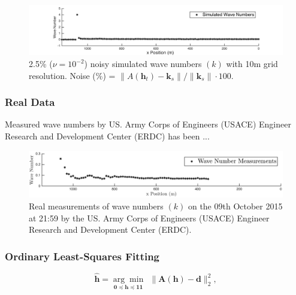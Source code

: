 \begin{figure}[H]
\center
\includegraphics[scale=0.6]{img/simulated_data_k10m.png} 
\caption{2.5\% ($\nu = 10^{-2}$) noisy simulated wave numbers $(k)$ with 10m grid resolution. Noise (\%) = $\|A(\mathbf{h}_t) -  \mathbf{k}_s\| / \|  \mathbf{k}_s \| \cdot 100$. }
\label{Simulated10m}
\end{figure}


\subsubsection{Real Data}


Measured wave numbers by US. Army Corps of Engineers (USACE) Engineer Research and Development Center (ERDC) has been ...

\begin{figure}[H]
\center
\includegraphics[scale=0.5]{img/real_data_k_Oct09.png} 
\caption{Real measurements of wave numbers $(k)$ on the 09th October 2015 at 21:59 by the US. Army Corps of Engineers (USACE) Engineer Research and Development Center (ERDC).}
\label{RealData_oct09}
\end{figure}




\subsubsection{Ordinary Least-Squares Fitting}

\begin{equation}\label{LS-BC}
\mathbf{\hat{h}}= \underset{\mathbf{0} \preceq \mathbf{h} \preceq \mathbf{11} }{\arg \min} \ \  \|  \mathbf{A}(\mathbf{h}) -  \mathbf{d} \|_2^2,
\end{equation}

